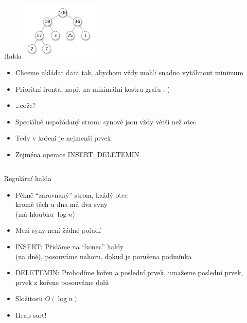 \documentclass{beamer}
\begin{document}
\subsection{}
\begin{frame}{Halda}
\includegraphics[width=4cm]{Heap.pdf}
\begin{itemize}
\item Chceme ukládat data tak, abychom vždy mohli snadno vytáhnout minimum
\item Prioritní fronta, např. na minimální kostru grafu :-)
\pause
\item \dots cože?
\pause
\item Speciálně uspořádaný strom: synové jsou vždy větší než otec
\item Tedy v kořeni je nejmenší prvek
\item Zejména operace INSERT, DELETEMIN
\end{itemize}
\end{frame}

\subsection{}
\begin{frame}{Regulární halda}
\begin{itemize}
\item Pěkně ``zarovnaný'' strom, každý otec \\ kromě těch u dna má dva syny \\ (má hloubku $\log n$)
\item Mezi syny není žádné pořadí
\item INSERT: Přidáme na ``konec'' haldy \\ (na dně), posouváme nahoru, dokud je porušena podmínka
\item DELETEMIN: Prohodíme kořen a poslední prvek, umažeme poslední prvek, prvek z kořene posouváme dolů
\item Složitosti $O(\log n)$
\item Heap sort!
\end{itemize}
\end{frame}
\end{document}
